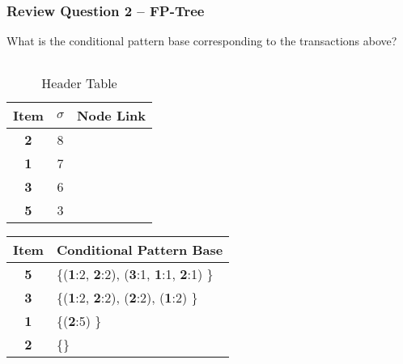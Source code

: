 \documentclass[aspectratio=169, 10pt]{beamer}
\begin{document}
\begin{frame}[t]
\frametitle{Review Question 2 -- FP-Tree}
\small

What is the conditional pattern base corresponding to the transactions above?

\begin{columns}
    \begin{column}{0.5\textwidth} 
        \begin{table}[]
            \begin{tabular}{c|c|c}
                Item      & $\sigma$  & Node Link \\ \hline
                \textbf{2}         & 8         &           \\
                \textbf{1}         & 7         &           \\
                \textbf{3}         & 6         &           \\
                \textbf{5}         & 3         &           \\
            \end{tabular}
            \caption{Header Table}
        \end{table}

        \begin{table}[]
            \begin{tabular}{c|l}
                Item      & Conditional Pattern Base \\ \hline
                \textbf{5} & \{(\textbf{1}:2, \textbf{2}:2), (\textbf{3}:1, \textbf{1}:1, \textbf{2}:1) \} \\
                \textbf{3} & \{(\textbf{1}:2, \textbf{2}:2), (\textbf{2}:2), (\textbf{1}:2) \}\\
                \textbf{1} & \{(\textbf{2}:5) \}\\
                \textbf{2} & \{\}\\
            \end{tabular}
        \end{table}
    \end{column}
    \begin{column}{0.5\textwidth} %
        \begin{figure}
            \center
\end{figure}
\end{column}
\end{columns}
\end{frame}
\end{document}
